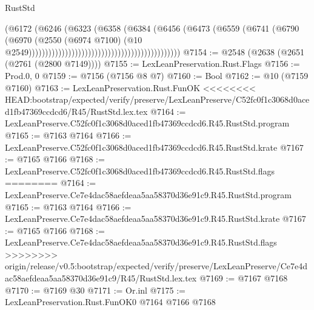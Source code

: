 \begin{lexlean}{RustStd}
\begin{coremodule}
{\begin{coremodule}
{{{{{{{{{{{{{{{{{{{{{{{{{{{{{{{{                                                                      (@6172
                                                                        (@6246
                                                                          (@6323
                                                                            (@6358
                                                                              (@6384
                                                                                (@6456
                                                                                  (@6473
                                                                                    (@6559
                                                                                      (@6741
                                                                                        (@6790
                                                                                          (@6970
                                                                                            (@2550
                                                                                              (@6974
                                                                                                @7100)
                                                                                              (@10
                                                                                                @2549))))))))))))))))))))))))))))))))))))))))))))))
@7154 := @2548 (@2638 (@2651 (@2761 (@2800 @7149))))
@7155 := LexLeanPreservation.Rust.Flags
@7156 := Prod.{0, 0}
@7159 := @7156 (@7156 @8 @7)
@7160 := Bool
@7162 := @10 (@7159 @7160)
@7163 := LexLeanPreservation.Rust.FunOK
<<<<<<<< HEAD:bootstrap/expected/verify/preserve/LexLeanPreserve/C52fc0f1c3068d0aced1fb47369ccdcd6/R45/RustStd.lex.tex
@7164 := LexLeanPreserve.C52fc0f1c3068d0aced1fb47369ccdcd6.R45.RustStd.program
@7165 := @7163 @7164
@7166 := LexLeanPreserve.C52fc0f1c3068d0aced1fb47369ccdcd6.R45.RustStd.krate
@7167 := @7165 @7166
@7168 := LexLeanPreserve.C52fc0f1c3068d0aced1fb47369ccdcd6.R45.RustStd.flags
========
@7164 := LexLeanPreserve.Ce7e4dac58aefdeaa5aa58370d36e91c9.R45.RustStd.program
@7165 := @7163 @7164
@7166 := LexLeanPreserve.Ce7e4dac58aefdeaa5aa58370d36e91c9.R45.RustStd.krate
@7167 := @7165 @7166
@7168 := LexLeanPreserve.Ce7e4dac58aefdeaa5aa58370d36e91c9.R45.RustStd.flags
>>>>>>>> origin/release/v0.5:bootstrap/expected/verify/preserve/LexLeanPreserve/Ce7e4dac58aefdeaa5aa58370d36e91c9/R45/RustStd.lex.tex
@7169 := @7167 @7168
@7170 := @7169 @30
@7171 := Or.inl
@7175 := LexLeanPreservation.Rust.FunOK0 @7164 @7166 @7168
}}}}}}}}}}}}}}}}}}}}}}}}}}}}}}}}
\end{coremodule}}
\end{coremodule}
\end{lexlean}
